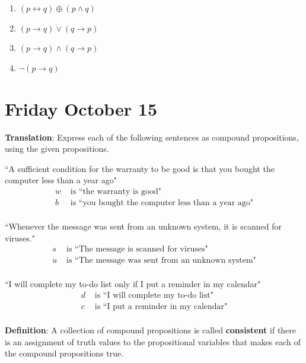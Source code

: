 \documentclass[12pt, oneside]{article}
\begin{document}
\begin{enumerate}
\begin{enumerate}
    \item $(p \leftrightarrow q) \oplus (p \land q)$
    \item $(p \to q) \vee (q \to p)$
    \item $(p \to q) \land (q \to p)$
    \item $\lnot (p \to q) $
\end{enumerate} \end{enumerate}
\newpage
\section*{Friday October 15}


{\bf Translation}: Express each of the following sentences as compound propositions, using
the given propositions.

\begin{multicols}{2}
``A sufficient condition for the warranty to be good is that you bought the computer less than a year ago"
\columnbreak
\begin{align*}
w &\text{ is  ``the warranty is good"} \\
b &\text{ is  ``you bought the computer less than a year ago"} \\
\end{align*}
\end{multicols}
\vfill

\begin{multicols}{2}
``Whenever the message was sent from an unknown system, it is scanned for viruses."
\columnbreak
\begin{align*}
s &\text{ is  ``The message is scanned for viruses"} \\
u &\text{ is  ``The message was sent from an unknown system"} \\
\end{align*}
\end{multicols}
\vfill

\begin{multicols}{2}
``I will complete my to-do list only if I put a reminder in my calendar"
\columnbreak
\begin{align*}
d &\text{ is  ``I will complete my to-do list"} \\
c &\text{ is  ``I put a reminder in my calendar"} \\
\end{align*}
\end{multicols}
\vfill \newpage


{\bf Definition}: A collection of  compound  propositions
is called {\bf consistent} if  there
is  an assignment  of  truth values
to  the  propositional variables that makes
each of the compound propositions  true.
 
\end{document}
